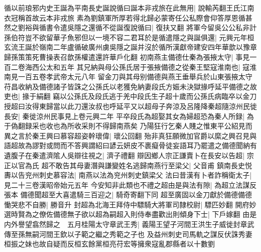 循以前琅邪内史王誕為平南長史誕說循曰誕本非戎旅在此無用|{
	說輸芮翻王氏江南衣冠稱首故云本非戎旅}
素為劉鎮軍所厚若得北歸必蒙寄任公私際會仰答厚恩循甚然之劉裕與循書令遣吳隱之還循不從誕復說循曰|{
	復扶又翻}
將軍今留吳公公私非計孫伯符豈不欲留華子魚邪但以一境不容二君耳於是循遣隱之與誕俱還|{
	元興元年桓玄流王誕於嶺南二年盧循破廣州虜吳隱之誕并沒於循所漢獻帝建安四年華歆以豫章歸孫策策死曹操表召歆孫權遣還許華戶化翻}
初南燕主備德仕秦為張掖太守|{
	事見一百二卷海西公太和五年}
其兄納與母公孫氏居于張掖備德之從秦王堅寇淮南也|{
	寇淮南見一百五卷孝武帝太元八年}
留金刀與其母别備德與燕王垂舉兵於山東張掖太守苻昌收納及備德諸子皆誅之公孫氏以老獲免納妻段氏方娠未決獄掾呼延平備德之故吏也|{
	掾于絹翻}
竊以公孫氏及段氏逃于羌中段氏生子超十歲而公孫氏病臨卒以金刀授超曰汝得東歸當以此刀還汝叔也呼延平又以超母子奔涼及呂隆降秦超隨涼州民徙長安|{
	秦徙涼州民事見上卷元興二年}
平卒段氏為超娶其女為婦超恐為秦人所録|{
	為于偽翻録采也收也為所收采則不得歸南燕矣}
乃陽狂行乞秦人賤之惟東平公紹見而異之言於秦王興曰慕容超姿幹瓌偉|{
	瓌公回翻}
殆非真狂願微加官爵以縻之興召見與語超故為謬對或問而不答興謂紹曰諺云妍皮不裹癡骨徒妄語耳乃罷遣之備德聞納有遺腹子在秦遣濟隂人吳辯往視之|{
	濟子禮翻}
辯因鄉人宗正謙賣卜在長安以告超|{
	宗正以官為氏}
超不敢告其母妻潛與謙變姓名逃歸南燕行至梁父|{
	父音甫}
鎮南長史悦夀以告兖州刺史慕容法|{
	南燕以法為兖州刺史鎮梁父}
法曰昔漢有卜者詐稱衛太子|{
	見二十三卷漢昭帝始元五年}
今安知非此類也不禮之超由是與法有隙|{
	為超立法謀反張本}
備德聞超至大喜遣騎三百迎之|{
	騎奇寄翻下同}
超至廣固以金刀獻於備德備德慟哭悲不自勝|{
	勝音升}
封超為北海王拜侍中驃騎大將軍司隸校尉|{
	驃匹妙翻}
開府妙選時賢為之僚佐備德無子欲以超為嗣超入則侍奉盡歡出則傾身下士|{
	下戶嫁翻}
由是内外譽望翕然歸之　五月桂陽太守章武王秀|{
	義陽王望子河間王洪生子威徙封章武傳至孫無嗣河間王欽以子範之繼之秀範之子也}
及益州刺史司馬軌之謀反伏誅秀妻桓振之妹也故自疑而反桓玄餘黨桓亮苻宏等擁衆寇亂郡縣者以十數劉

